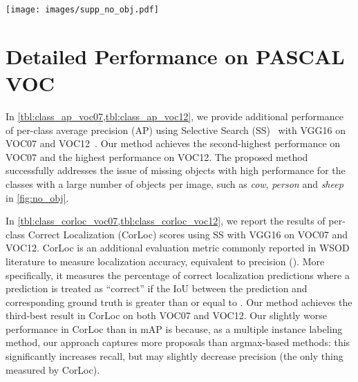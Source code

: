 \documentclass[runningheads]{llncs}
\begin{document}
\setcounter{equation}{6}
\setcounter{figure}{6}
\setcounter{table}{3}

\begin{figure*}[b!]
\centering
\texttt{[image: images/supp\_no\_obj.pdf]}
\caption{Analysis of a number of objects per image on PASCAL VOC datasets.}
\label{fig:no_obj}
\vspace*{-10mm}
\end{figure*}

\section{Detailed Performance on PASCAL VOC}
\label{sec:performance_voc}
In \cref{tbl:class_ap_voc07,tbl:class_ap_voc12}, we provide additional performance of per-class average precision (AP) using Selective Search (SS)~\cite{uijlings2013selective} with VGG16 on VOC07 and VOC12~\cite{Everingham15}. 
Our method achieves the second-highest performance on VOC07 and the highest performance on VOC12.
The proposed method successfully addresses the issue of missing objects with high performance for the classes with a large number of objects per image, such as \textit{cow}, \textit{person} and \textit{sheep} in \cref{fig:no_obj}.

In \cref{tbl:class_corloc_voc07,tbl:class_corloc_voc12}, we report the results of per-class Correct Localization (CorLoc) scores using SS with VGG16 on VOC07 and VOC12. 
CorLoc is an additional evaluation metric commonly reported in WSOD literature to measure localization accuracy, equivalent to precision ().
More specifically, it measures the percentage of correct localization predictions where a prediction is treated as ``correct'' if the IoU between the prediction and corresponding ground truth is greater than or equal to .
Our method achieves the third-best result in CorLoc on both VOC07 and VOC12.
Our slightly worse performance in CorLoc than in mAP is because, as a multiple instance labeling method, our approach captures more proposals than argmax-based methods: this significantly increases recall, but may slightly decrease precision (the only thing measured by CorLoc).
\end{document}
